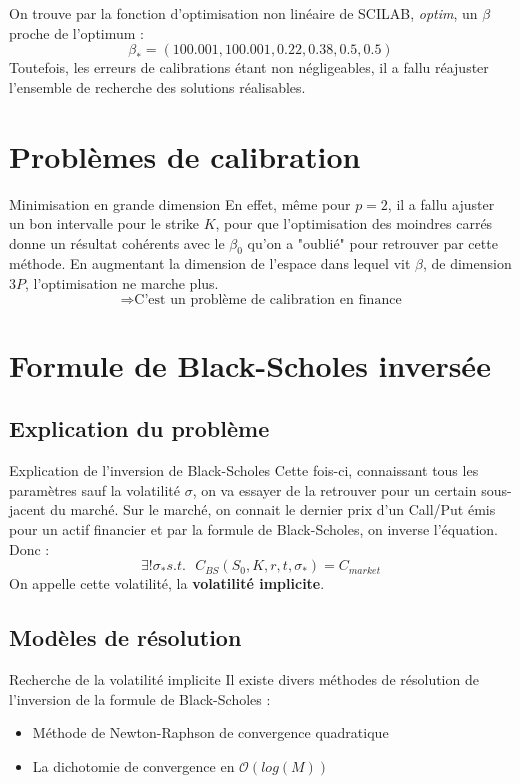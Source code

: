 \documentclass{beamer}
\begin{document}
\begin{frame}
  On trouve par la fonction d'optimisation non linéaire de SCILAB, \textit{optim}, un $\beta$ proche de l'optimum :
  $$ \beta_* = (100.001,100.001,0.22,0.38,0.5,0.5) $$
  Toutefois, les erreurs de calibrations étant non négligeables, il a fallu réajuster l'ensemble de recherche des solutions réalisables.
\end{frame}

\section{Problèmes de calibration}

\begin{frame}{Minimisation en grande dimension}
  En effet, même pour $p=2$, il a fallu ajuster un bon intervalle pour le strike $K$, pour que l'optimisation des moindres carrés donne un résultat cohérents avec le $\beta_0$ qu'on a "oublié" pour retrouver par cette méthode.
  \newline
  En augmentant la dimension de l'espace dans lequel vit $\beta$, de dimension $3P$, l'optimisation ne marche plus.
  $$ \Rightarrow \text{C'est un problème de calibration en finance} $$
\end{frame}

\section{Formule de Black-Scholes inversée}
\subsection{Explication du problème}

\begin{frame}{Explication de l'inversion de Black-Scholes}
Cette fois-ci, connaissant tous les paramètres sauf la volatilité $\sigma$, on va essayer de la retrouver pour un certain sous-jacent du marché. \newline
Sur le marché, on connait le dernier prix d'un Call/Put émis pour un actif financier et par la formule de Black-Scholes, on inverse l'équation.
\newline Donc :
$$ \exists ! \sigma_* s.t. \ \ \ C_{BS}(S_0,K,r,t,\sigma_*) = C_{market} $$
On appelle cette volatilité, la \textbf{volatilité implicite}.

\end{frame}

\subsection{Modèles de résolution}
\begin{frame}{Recherche de la volatilité implicite}
Il existe divers méthodes de résolution de l'inversion de la formule de Black-Scholes :
\begin{itemize}
  \item Méthode de Newton-Raphson de convergence quadratique
  \item La dichotomie de convergence en $\mathcal{O}(log(M))$
\end{itemize}
\end{frame}
\end{document}
